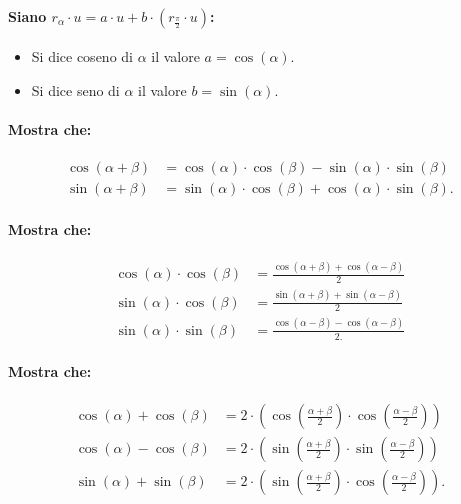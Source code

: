 \documentclass{article}
\begin{document}
\paragraph{Siano $r_\alpha \cdot u = a \cdot u + b \cdot (r_\frac{\pi}{2} \cdot u)$:}

\begin{itemize}
\item Si dice coseno di $\alpha$ il valore $a = \cos(\alpha)$.
\item Si dice seno di $\alpha$ il valore $b = \sin(\alpha)$.
\end{itemize}

\paragraph{Mostra che:}

\begin{align*}
\cos(\alpha + \beta) &= \cos(\alpha) \cdot \cos(\beta) - \sin(\alpha) \cdot \sin(\beta)\\
\sin(\alpha + \beta) &= \sin(\alpha) \cdot \cos(\beta) + \cos(\alpha) \cdot \sin(\beta).
\end{align*}

\paragraph{Mostra che:}

\begin{align*}
\cos(\alpha) \cdot \cos(\beta) &= \frac{\cos(\alpha + \beta) + \cos(\alpha - \beta)}{2}\\
\sin(\alpha) \cdot \cos(\beta) &= \frac{\sin(\alpha + \beta) + \sin(\alpha - \beta)}{2}\\
\sin(\alpha) \cdot \sin(\beta) &= \frac{\cos(\alpha - \beta) - \cos(\alpha - \beta)}{2.}
\end{align*}

\paragraph{Mostra che:}

\begin{align*}
\cos(\alpha) + \cos(\beta) &= 2 \cdot \left(\cos\left(\frac{\alpha + \beta}{2}\right) \cdot \cos\left(\frac{\alpha - \beta}{2}\right)\right)\\
\cos(\alpha) - \cos(\beta) &= 2 \cdot \left(\sin\left(\frac{\alpha + \beta}{2}\right) \cdot \sin\left(\frac{\alpha - \beta}{2}\right)\right)\\
\sin(\alpha) + \sin(\beta) &= 2 \cdot \left(\sin\left(\frac{\alpha + \beta}{2}\right) \cdot \cos\left(\frac{\alpha - \beta}{2}\right)\right).
\end{align*}
\end{document}
